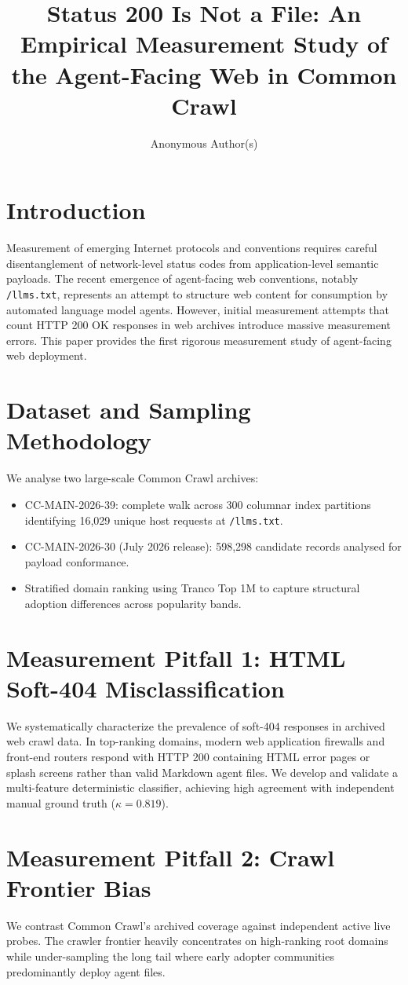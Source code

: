 \documentclass[sigconf,anonymous,review]{acmart}
\title{Status 200 Is Not a File: An Empirical Measurement Study of the Agent-Facing Web in Common Crawl}
\author{Anonymous Author(s)}
\affiliation{%
  \institution{Anonymous Institution}
  \country{Anonymous Country}
}
\begin{document}
\maketitle

\section{Introduction}
Measurement of emerging Internet protocols and conventions requires careful disentanglement of network-level status codes from application-level semantic payloads. The recent emergence of agent-facing web conventions, notably \texttt{/llms.txt}, represents an attempt to structure web content for consumption by automated language model agents. However, initial measurement attempts that count HTTP 200 OK responses in web archives introduce massive measurement errors. This paper provides the first rigorous measurement study of agent-facing web deployment.

\section{Dataset and Sampling Methodology}
We analyse two large-scale Common Crawl archives:
\begin{itemize}
    \item CC-MAIN-2026-39: complete walk across 300 columnar index partitions identifying 16,029 unique host requests at \texttt{/llms.txt}.
    \item CC-MAIN-2026-30 (July 2026 release): 598,298 candidate records analysed for payload conformance.
    \item Stratified domain ranking using Tranco Top 1M to capture structural adoption differences across popularity bands.
\end{itemize}

\section{Measurement Pitfall 1: HTML Soft-404 Misclassification}
We systematically characterize the prevalence of soft-404 responses in archived web crawl data. In top-ranking domains, modern web application firewalls and front-end routers respond with HTTP 200 containing HTML error pages or splash screens rather than valid Markdown agent files. We develop and validate a multi-feature deterministic classifier, achieving high agreement with independent manual ground truth ($\kappa = 0.819$).

\section{Measurement Pitfall 2: Crawl Frontier Bias}
We contrast Common Crawl's archived coverage against independent active live probes. The crawler frontier heavily concentrates on high-ranking root domains while under-sampling the long tail where early adopter communities predominantly deploy agent files.
\end{document}
